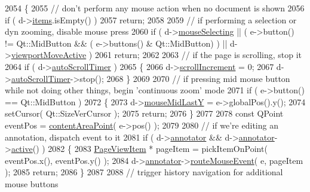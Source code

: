 \begin{DoxyCode}
2054 \{
2055     \textcolor{comment}{// don't perform any mouse action when no document is shown}
2056     \textcolor{keywordflow}{if} ( d->\hyperlink{classPageViewPrivate_ad90c795dead9abfaa5818a94e00435bc}{items}.isEmpty() )
2057         \textcolor{keywordflow}{return};
2058 
2059     \textcolor{comment}{// if performing a selection or dyn zooming, disable mouse press}
2060     \textcolor{keywordflow}{if} ( d->\hyperlink{classPageViewPrivate_a8819b152a8279b75359af2a3e0567681}{mouseSelecting} || ( e->button() != Qt::MidButton && ( e->buttons() & 
      Qt::MidButton) ) || d->\hyperlink{classPageViewPrivate_acc47dfc95cad4f126c4dbd3e8f31e43b}{viewportMoveActive} )
2061         \textcolor{keywordflow}{return};
2062 
2063     \textcolor{comment}{// if the page is scrolling, stop it}
2064     \textcolor{keywordflow}{if} ( d->\hyperlink{classPageViewPrivate_afe16a683945c2e7edf9906eb30ad6d8b}{autoScrollTimer} )
2065     \{
2066         d->\hyperlink{classPageViewPrivate_a514156a25a5fc564a7ddabe5d30bcecb}{scrollIncrement} = 0;
2067         d->\hyperlink{classPageViewPrivate_afe16a683945c2e7edf9906eb30ad6d8b}{autoScrollTimer}->stop();
2068     \}
2069 
2070     \textcolor{comment}{// if pressing mid mouse button while not doing other things, begin 'continuous zoom' mode}
2071     \textcolor{keywordflow}{if} ( e->button() == Qt::MidButton )
2072     \{
2073         d->\hyperlink{classPageViewPrivate_a0962e2c6de7921af1c3e42cae846bd65}{mouseMidLastY} = e->globalPos().y();
2074         setCursor( Qt::SizeVerCursor );
2075         \textcolor{keywordflow}{return};
2076     \}
2077 
2078     \textcolor{keyword}{const} QPoint eventPos = \hyperlink{classPageView_a7f432d3d6d05c69b568ad66a9c232cd7}{contentAreaPoint}( e->pos() );
2079 
2080     \textcolor{comment}{// if we're editing an annotation, dispatch event to it}
2081     \textcolor{keywordflow}{if} ( d->\hyperlink{classPageViewPrivate_a07bad73b61f6b400411aacc7e2e820a0}{annotator} && d->\hyperlink{classPageViewPrivate_a07bad73b61f6b400411aacc7e2e820a0}{annotator}->\hyperlink{classPageViewAnnotator_ae7fcfee911a4eb7811865863d852ffac}{active}() )
2082     \{
2083         \hyperlink{classPageViewItem}{PageViewItem} * pageItem = pickItemOnPoint( eventPos.x(), eventPos.y() );
2084         d->\hyperlink{classPageViewPrivate_a07bad73b61f6b400411aacc7e2e820a0}{annotator}->\hyperlink{classPageViewAnnotator_a6cd952408052c6d7de1c1111d61266b0}{routeMouseEvent}( e, pageItem );
2085         \textcolor{keywordflow}{return};
2086     \}
2087 
2088     \textcolor{comment}{// trigger history navigation for additional mouse buttons}

\end{DoxyCode}
